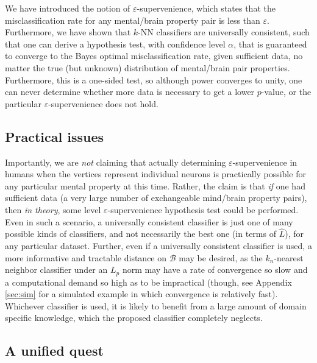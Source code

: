 \documentclass{article}
\newcommand{\mB}{\mathcal{B}}
\newcommand{\eps}{\varepsilon}
\providecommand{\mh}[1]{\widehat{#1}}
\begin{document}
We have introduced the notion of $\eps$-supervenience, which states that the misclassification rate for any mental/brain property pair is less than $\eps$.  Furthermore, we have shown that $k$-NN classifiers are universally consistent, such that one can derive a hypothesis test, with confidence level $\alpha$, that is guaranteed to converge to the Bayes optimal misclassification rate, given sufficient data, no matter the true (but unknown) distribution of mental/brain pair properties.  Furthermore, this is a one-sided test, so although power converges to unity, one can never determine whether more data is necessary to get a lower $p$-value, or the particular $\eps$-supervenience does not hold.  

\subsection{Practical issues} %
\label{par:practical_issues}

Importantly, we are \emph{not} claiming that actually determining $\eps$-supervenience in humans when the vertices represent individual neurons is practically possible for any particular mental property at this time.  Rather, the claim is that \emph{if} one had sufficient data (a very large number of exchangeable mind/brain property pairs), then \emph{in theory}, some level $\eps$-supervenience hypothesis test could be performed.  Even in such a scenario, a universally consistent classifier is just one of many possible kinds of classifiers, and not necessarily the best one (in terms of $\mh{L}$), for any particular dataset.  Further, even if a universally consistent classifier is used, a more informative and tractable distance on $\mB$ may be desired, as the $k_n$-nearest neighbor classifier under an $L_p$ norm may have a rate of convergence so slow and a computational demand so high as to be impractical (though, see Appendix \ref{sec:sim} for a simulated example in which convergence is relatively fast).  Whichever classifier is used, it is likely to benefit from a large amount of domain specific knowledge, which the proposed classifier completely neglects.





\subsection{A unified quest} %
\label{sub:practical_applications}
\end{document}
